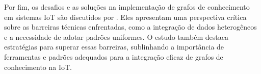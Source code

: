 Por fim, os desafios e as soluções na implementação de grafos de conhecimento em sistemas IoT são discutidos por \cite{Soldatos2015}. Eles apresentam uma perspectiva crítica sobre as barreiras técnicas enfrentadas, como a integração de dados heterogêneos e a necessidade de adotar padrões uniformes. O estudo também destaca estratégias para superar essas barreiras, sublinhando a importância de ferramentas e padrões adequados para a integração eficaz de grafos de conhecimento na IoT.
